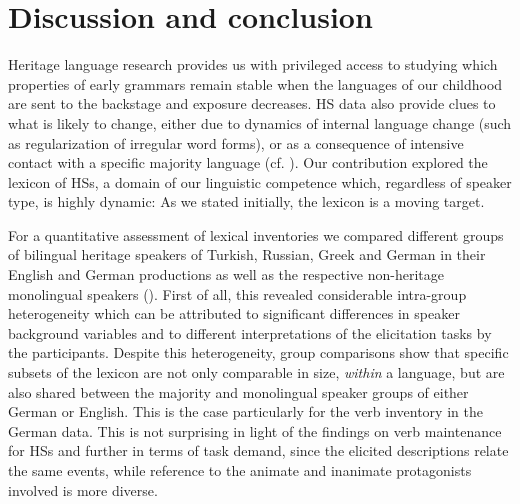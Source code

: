 \documentclass[output=paper,colorlinks,citecolor=brown]{langscibook}
\begin{document}

\section{Discussion and conclusion} \label{sec:kelleretal:discussion}

Heritage language research provides us with privileged access to studying which properties of early grammars remain stable when the languages of our childhood are sent to the backstage and exposure decreases. HS data also provide clues to what is likely to change, either due to dynamics of internal language change (such as regularization of irregular word forms), or as a consequence of intensive contact with a specific majority language (cf. \cite{chapters/05}). Our contribution explored the lexicon of HSs, a domain of our linguistic competence which, regardless of speaker type, is highly dynamic: As we stated initially, the lexicon is a moving target.

For a quantitative assessment of lexical inventories we compared different groups of bilingual heritage speakers of Turkish, Russian, Greek and German in their English and German productions as well as the respective non-heritage monolingual speakers (). First of all, this revealed considerable intra-group heterogeneity which can be attributed to significant differences in speaker background variables and to different interpretations of the elicitation tasks by the participants. Despite this heterogeneity, group comparisons show that specific subsets of the lexicon are not only comparable in size, \textit{within} a language, but are also shared between the majority and monolingual speaker groups of either German or English. This is the case particularly for the verb inventory in the German data. This is not surprising in light of the findings on verb maintenance for HSs \citep{Polinsky2005WordClassIncompGrammar, FridmanMeir2023LexProdInnov} and further in terms of task demand, since the elicited descriptions relate the same events, while reference to the animate and inanimate protagonists involved is more diverse. 
\end{document}
